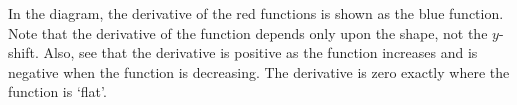 \begin{ex}
  In the diagram, the derivative of the red functions is shown as the blue function. Note
  that the derivative of the function depends only upon the shape, not the $ y$-shift. Also,
  see that the derivative is positive as the function increases and is negative when the
  function is decreasing. The derivative is zero exactly where the function is `flat'.

  \begin{center}
  \end{center}
\end{ex}

\clearpage
